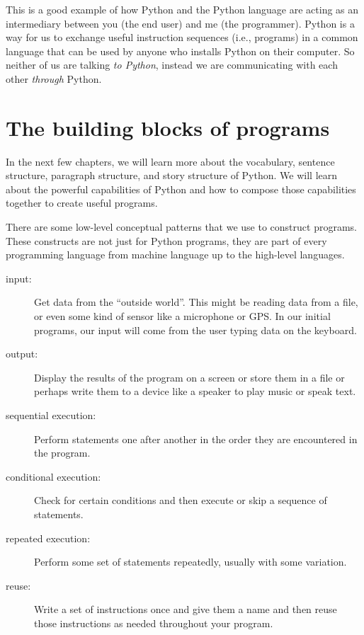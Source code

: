 This is a good example of how Python and the Python language are acting as an intermediary
between you (the end user) and me (the programmer).  Python is a way for us to exchange useful
instruction sequences (i.e., programs) in a common language that can be used by anyone who 
installs Python on their computer.  So neither of us are talking {\em to Python},
instead we are communicating with each other {\em through} Python.

\section{The building blocks of programs}

In the next few chapters, we will learn more about the vocabulary, sentence structure,
paragraph structure, and story structure of Python.  We will learn about the powerful
capabilities of Python and how to compose those capabilities together to create useful
programs.

There are some low-level conceptual patterns that we use to construct programs.  These
constructs are not just for Python programs, they are part of every programming language
from machine language up to the high-level languages.

\begin{description}

\item[input:] Get data from the ``outside world''.  This might be 
reading data from a file, or even some kind of sensor like 
a microphone or GPS.  In our initial programs, our input will come from the user
typing data on the keyboard.

\item[output:] Display the results of the program on a screen
or store them in a file or perhaps write them to a device like a
speaker to play music or speak text.

\item[sequential execution:] Perform statements one after
another in the order they are encountered in the program.

\item[conditional execution:] Check for certain conditions and
then execute or skip a sequence of statements.

\item[repeated execution:] Perform some set of statements 
repeatedly, usually with
some variation.

\item[reuse:] Write a set of instructions once and give them a name
and then reuse those instructions as needed throughout your program.

\end{description}

